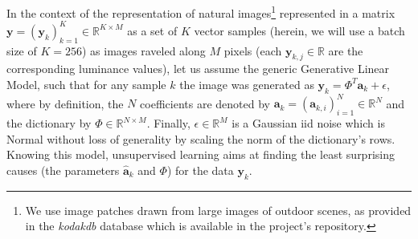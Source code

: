\documentclass[letterpaper,final,conference,10pt]{IEEEtran}
\newcommand{\citep}[1]{\cite{#1}}
\newcommand{\coef}{\mathbf{a}} %
\newcommand{\image}{\mathbf{y}} %
\newcommand{\dico}{\Phi} %
\newcommand{\eqdef}{\ensuremath{\stackrel{\mbox{\upshape\tiny def.}}{=}}}
\newcommand{\RR}{\mathbb{R}}
\begin{document}
In the context of the representation of natural images\footnote{We use image patches drawn from large images of outdoor scenes, as provided in the \emph{kodakdb} database which is available in the project's repository. %
} represented in a matrix $\image = (\image_k)_{k=1}^K \in \RR^{K \times M}$ as a set of $K$ vector samples (herein, we will use a batch size of $K=256$) as images raveled along $M$ pixels (each $\image_{k, j} \in \RR$ are the corresponding luminance values), let us assume the generic Generative Linear Model, such that for any sample $k$ the image was generated as $\image_k = \dico^T \coef_{k} + \epsilon $, where by definition, the $N$ coefficients are denoted by $\coef_{k} = (\coef_{k, i})_{i=1}^N \in \RR^{N}$ and the dictionary by $\dico \in \RR^{N \times M}$. Finally, $\epsilon \in \RR^{M}$ is a Gaussian iid noise which is Normal without loss of generality by scaling the norm of the dictionary's rows. Knowing this model, unsupervised learning aims at finding the least surprising causes (the parameters $\hat{\coef}_{k}$ and $\dico$) for the data $\image_k$.
\end{document}
